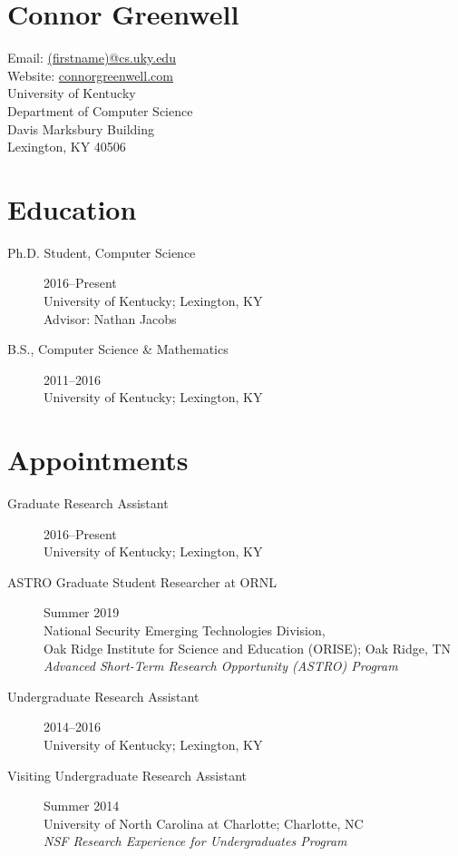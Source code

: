 \documentclass[12pt]{extarticle}
\begin{document}
\section*{\bf\huge Connor Greenwell}
Email: \href{mailto:(firstname)@cs.uky.edu}{(firstname)@cs.uky.edu} \\
Website: \href{http://connorgreenwell.com}{connorgreenwell.com} \\
University of Kentucky\\
Department of Computer Science\\
Davis Marksbury Building\\
Lexington, KY 40506

\section*{Education}

\begin{description}
    \item[Ph.D. Student, Computer Science] 2016--Present \\
        University of Kentucky; Lexington, KY \\
        Advisor: Nathan Jacobs
    \item[B.S., Computer Science \& Mathematics] 2011--2016 \\
        University of Kentucky; Lexington, KY
\end{description}

\section*{Appointments}

\begin{description}
    \item[Graduate Research Assistant] 2016--Present \\
        University of Kentucky; Lexington, KY
    \item[ASTRO Graduate Student Researcher at ORNL] Summer 2019 \\
        National Security Emerging Technologies Division, \\
        Oak Ridge Institute for Science and Education (ORISE); Oak Ridge, TN \\
        \emph{Advanced Short-Term Research Opportunity (ASTRO) Program}
    \item[Undergraduate Research Assistant] 2014--2016 \\
        University of Kentucky; Lexington, KY
    \item[Visiting Undergraduate Research Assistant] Summer 2014 \\
        University of North Carolina at Charlotte; Charlotte, NC \\
        \emph{NSF Research Experience for Undergraduates Program}
\end{description}
\end{document}
